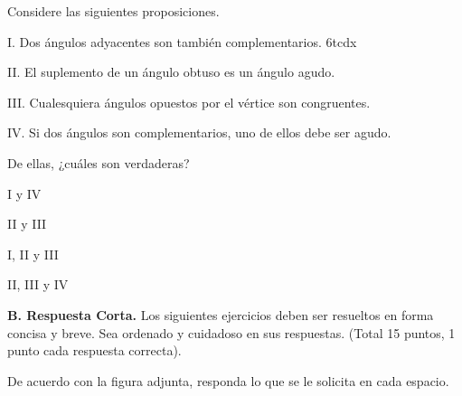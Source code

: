 \documentclass[12pt, fleqn]{article}
\begin{document}
\item  Considere las siguientes proposiciones. \vs

\begin{tcolorbox}
\benu
\item[I.] Dos ángulos adyacentes son también complementarios.
6tcdx\item[II.] El suplemento de un ángulo obtuso es un ángulo agudo.
\item[III.] Cualesquiera ángulos opuestos por el vértice son congruentes.
\item[IV.] Si dos ángulos son complementarios, uno de ellos debe ser agudo.
\eenu
\end{tcolorbox}
\vp

De ellas, ¿cuáles son {\sc verdaderas}? \vp

\benu
\item[] \opc I y IV \vf
\item[] \opc II y III \vf
\item[] \opc I, II y III \vf
\item[] \opc II, III y IV
\eenu

\eenu

\pagebreak

{\bf B. Respuesta Corta.} Los siguientes ejercicios deben ser resueltos en forma concisa y breve. Sea ordenado y cuidadoso en sus respuestas. (Total 15 puntos, 1 punto cada respuesta correcta).\vp

\benu
\item De acuerdo con la figura adjunta, responda lo que se le solicita en cada espacio. \vs
\end{document}
